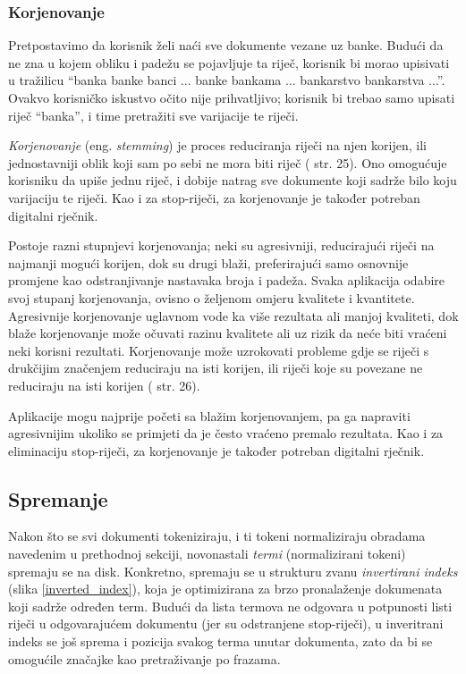 \documentclass[a4paper,twoside,12pt]{scrreprt}
\begin{document}
\subsubsection{Korjenovanje}

Pretpostavimo da korisnik želi naći sve dokumente vezane uz banke. Budući da ne zna u kojem obliku i padežu se pojavljuje ta riječ, korisnik bi morao upisivati u tražilicu ``banka banke banci ... banke bankama ... bankarstvo bankarstva ...''. Ovakvo korisničko iskustvo očito nije prihvatljivo; korisnik bi trebao samo upisati riječ ``banka'', i time pretražiti sve varijacije te riječi.

\textit{Korjenovanje} (eng. \textit{stemming}) je proces reduciranja riječi na njen korijen, ili jednostavniji oblik koji sam po sebi ne mora biti riječ (\cite{taming} str. 25). Ono omogućuje korisniku da upiše jednu riječ, i dobije natrag sve dokumente koji sadrže bilo koju varijaciju te riječi. Kao i za stop-riječi, za korjenovanje je također potreban digitalni rječnik.

Postoje razni stupnjevi korjenovanja; neki su agresivniji, reducirajući riječi na najmanji mogući korijen, dok su drugi blaži, preferirajući samo osnovnije promjene kao odstranjivanje nastavaka broja i padeža. Svaka aplikacija odabire svoj stupanj korjenovanja, ovisno o željenom omjeru kvalitete i kvantitete. Agresivnije korjenovanje uglavnom vode ka više rezultata ali manjoj kvaliteti, dok blaže korjenovanje može očuvati razinu kvalitete ali uz rizik da neće biti vraćeni neki korisni rezultati. Korjenovanje može uzrokovati probleme gdje se riječi s drukčijim značenjem reduciraju na isti korijen, ili riječi koje su povezane ne reduciraju na isti korijen (\cite{taming} str. 26).

Aplikacije mogu najprije početi sa blažim korjenovanjem, pa ga napraviti agresivnijim ukoliko se primjeti da je često vraćeno premalo rezultata. Kao i za eliminaciju stop-riječi, za korjenovanje je također potreban digitalni rječnik.

\subsection{Spremanje}

Nakon što se svi dokumenti tokeniziraju, i ti tokeni normaliziraju obradama navedenim u prethodnoj sekciji, novonastali \textit{termi} (normalizirani tokeni) spremaju se na disk. Konkretno, spremaju se u strukturu zvanu \textit{invertirani indeks} (slika \ref{inverted_index}), koja je optimizirana za brzo pronalaženje dokumenata koji sadrže određen term. Budući da lista termova ne odgovara u potpunosti listi riječi u odgovarajućem dokumentu (jer su odstranjene stop-riječi), u inveritrani indeks se još sprema i pozicija svakog terma unutar dokumenta, zato da bi se omogućile značajke kao pretraživanje po frazama.
\end{document}
